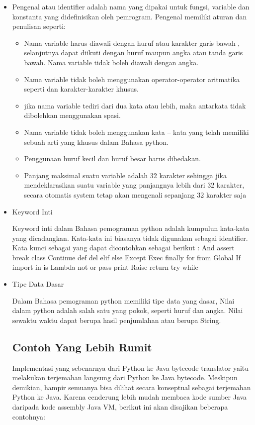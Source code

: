 \documentclass[12pt,a4paper]{article}
\begin{document}
\begin{itemize}

\item Pengenal atau identifier adalah nama yang dipakai untuk fungsi, variable dan konstanta yang didefinisikan oleh pemrogram. Pengenal memiliki aturan dan penulisan seperti:

\begin{itemize}

\item Nama variable harus diawali dengan huruf atau karakter garis bawah , selanjutnya dapat diikuti dengan huruf maupun angka atau tanda garis bawah. Nama variable tidak boleh diawali dengan angka.
\item Nama variable tidak boleh menggunakan operator-operator aritmatika seperti dan karakter-karakter khusus. 
\item jika nama variable tediri dari dua kata atau lebih, maka antarkata tidak dibolehkan menggunakan spasi.
\item Nama variable tidak boleh menggunakan kata – kata yang telah memiliki sebuah arti yang khusus dalam Bahasa python.
\item Penggunaan huruf kecil dan huruf besar harus dibedakan.
\item Panjang maksimal suatu variable adalah 32 karakter sehingga jika mendeklarasikan suatu variable yang panjangnya lebih dari 32 karakter, secara otomatis system tetap akan mengenali sepanjang 32 karakter saja
\end{itemize}
\item Keyword Inti

Keyword inti dalam Bahasa pemograman python adalah kumpulun kata-kata yang dicadangkan. Kata-kata ini biasanya tidak digunakan sebagai identifier. Kata kunci sebagai yang dapat dicontohkan sebagai berikut :
And  assert  break  class
Continue  def  del  elif  else
Except
Exec  finally  for  from
Global
If  import  in  is
Lambda  not  or  pass  print
Raise  return  try  while

\item Tipe Data Dasar

Dalam Bahasa pemograman python memiliki tipe data yang dasar, Nilai dalam python adalah salah satu yang pokok, seperti huruf dan angka. Nilai sewaktu waktu dapat berupa hasil penjumlahan atau berupa String.

\subsection{Contoh Yang Lebih Rumit}
	Implementasi yang sebenarnya dari Python  ke Java bytecode translator yaitu melakukan terjemahan langsung dari Python ke Java bytecode. Meskipun demikian, hampir semuanya  bisa dilihat secara konseptual sebagai terjemahan Python ke Java. Karena cenderung lebih mudah membaca kode sumber Java daripada kode assembly Java VM, berikut ini akan disajikan beberapa contohnya:


\end{itemize}
\end{document}

